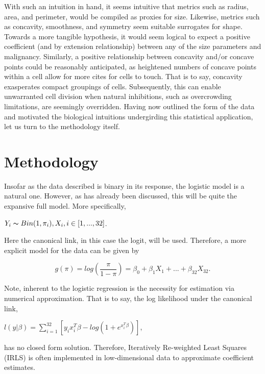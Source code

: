 \documentclass[11pt]{article}
\begin{document}
	With such an intuition in hand, it seems intuitive that metrics such as radius, area, and perimeter, would be compiled as proxies for size.  Likewise, metrics such as concavity, smoothness, and symmetry seem suitable surrogates for shape.  Towards a more tangible hypothesis, it would seem logical to expect a positive coefficient (and by extension relationship) between any of the size parameters and malignancy.   Similarly, a positive relationship between concavity and/or concave points could be reasonably anticipated, as heightened numbers of concave points within a cell allow for more cites for cells to touch.  That is to say, concavity exasperates compact groupings of cells.  Subsequently, this can enable unwarranted cell division when natural inhibitions, such as overcrowding limitations, are seemingly overridden.   Having now outlined the form of the data and motivated the biological intuitions undergirding this statistical application, let us turn to the methodology itself.  
	
	\section{Methodology}
	
	Insofar as the data described is binary in its response, the logistic model is a natural one.  However, as has already been discussed, this will be quite the expansive full model.  More specifically,
	\begin{center}
\label{eqn:model}
$Y_i \thicksim Bin(1,\pi_i), X_i, i \in [1,...,32]$. 
\end{center}  

Here the canonical link, in this case the logit, will be used.  Therefore, a more explicit model for the data can be given by 


\begin{equation}
\label{eqn:model}
g(\pi)=log(\frac{\pi}{1-\pi})=\beta_0+\beta_1X_1+...+\beta_{32}X_{32}.
\end{equation}

  Note, inherent to the logistic regression is the necessity for estimation via numerical approximation.  That is to say, the log likelihood under the canonical link, 
   \begin{center}
  $l(y|\beta)=\sum_{i=1}^{32} [y_ix_i^T\beta-log(1+e^{x_i^T\beta})]$, 
  \end{center}

 has no closed form solution.  Therefore, Iteratively Re-weighted Least Squares (IRLS) is often implemented in low-dimensional data to approximate coefficient estimates.  
  
\end{document}
